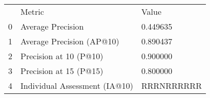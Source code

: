 \begin{tabular}{lll}
 & Metric & Value \\
0 & Average Precision & 0.449635 \\
1 & Average Precision (AP@10) & 0.890437 \\
2 & Precision at 10 (P@10) & 0.900000 \\
3 & Precision at 15 (P@15) & 0.800000 \\
4 & Individual Assessment (IA@10) & RRRNRRRRRR \\
\end{tabular}
